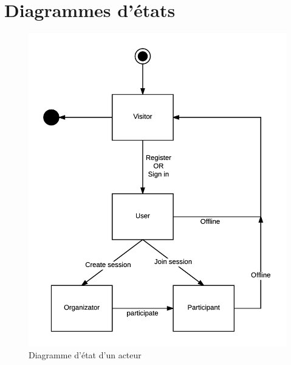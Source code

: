 \documentclass[titlepage, 12pt]{report}
\begin{document}
\chapter{Diagrammes d'états}  

\begin{figure}[!h]
	\caption{Diagramme d'état d'un acteur}
	\label{state_actor_diagram}
	\centering
	\includegraphics[scale=0.8]{Images/diagram/state_actor_diagram.png}
\end{figure}
\end{document}
